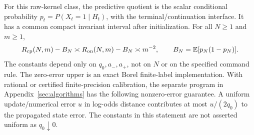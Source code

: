 \begin{theorem}\label{thm:hmm}
For this raw-kernel class, the predictive quotient is the scalar conditional probability $p_t=P(X_t=1\mid H_t)$, with the terminal/continuation interface. It has a common compact invariant interval after initialization. For all $N\ge1$ and $m\ge1$,
\begin{equation}\label{eq:hmm-law}
 R_{\mathrm{cp}}(N,m)-B_N\asymp R_{\mathrm{on}}(N,m)-B_N\asymp m^{-2},
 \qquad B_N=\mathbb E[p_N(1-p_N)].
\end{equation}
The constants depend only on $q_0,a_-,a_+$, not on $N$ or on the specified command rule. The zero-error upper is an exact Borel finite-label implementation. With rational or certified finite-precision calibration, the separate program in Appendix~\ref{sec:algorithms} has the following nonzero-error guarantee. A uniform update/numerical error $u$ in log-odds distance contributes at most $u/(2q_0)$ to the propagated state error. The constants in this statement are not asserted uniform as $q_0\downarrow0$.
\end{theorem}
